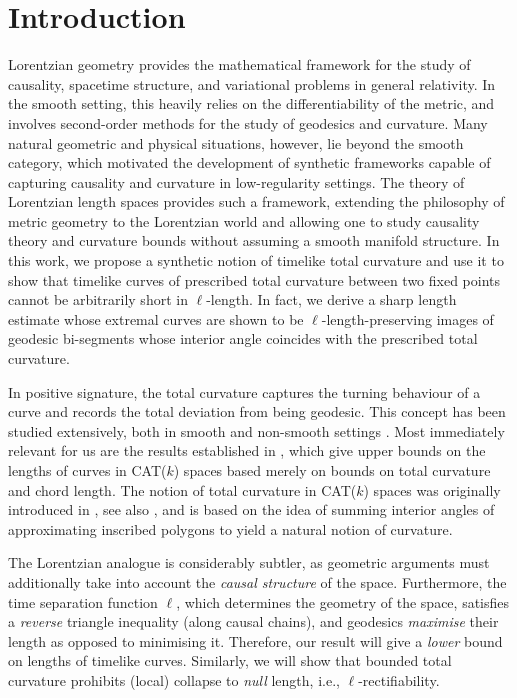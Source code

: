 \documentclass[hidelinks,12pt,a4paper]{article}
\numberwithin{equation}{section}
\theoremstyle{plain}
\theoremstyle{definition}
\begin{document}
\section{Introduction}
Lorentzian geometry provides the mathematical framework for the study of causality, spacetime structure, and variational problems in general relativity. 
In the smooth setting, this heavily relies on the differentiability of the metric, and involves second-order methods for the study of geodesics and curvature.
Many natural geometric and physical situations, however, lie beyond the smooth category, which motivated the development of synthetic frameworks capable of capturing causality and curvature in low-regularity settings.
The theory of Lorentzian length spaces \cite{KS18} provides such a framework, extending the philosophy of metric geometry to the Lorentzian world and allowing one to study causality theory and curvature bounds without assuming a smooth manifold structure. 
In this work, we propose a synthetic notion of timelike total curvature and use it to show that timelike curves of prescribed total curvature between two fixed points cannot be arbitrarily short in $\ell$-length. 
In fact, we derive a sharp length estimate whose extremal curves are shown to be $\ell$-length-preserving images of geodesic bi-segments whose interior angle coincides with the prescribed total curvature.

In positive signature, the total curvature captures the turning behaviour of a curve and records the total deviation from being geodesic. 
This concept has been studied extensively, both in smooth and non-smooth settings \cite{Mil50, Gra89, ABG2010, BFG15, CS24}.
Most immediately relevant for us are the results established in \cite{ML2003, CM16}, which give upper bounds on the lengths of curves in CAT($k$) spaces based merely on bounds on total curvature and chord length.
The notion of total curvature in CAT($k$) spaces was originally introduced in \cite{AB98}, see also \cite{LMM2010}, and is based on the idea of summing interior angles of approximating inscribed polygons to yield a natural notion of curvature.

The Lorentzian analogue is considerably subtler, as geometric arguments must additionally take into account the \emph{causal structure} of the space.
Furthermore, the time separation function $\ell$, which determines the geometry of the space, satisfies a \emph{reverse} triangle inequality (along causal chains), and geodesics \emph{maximise} their length as opposed to minimising it. 
Therefore, our result will give a \emph{lower} bound on lengths of timelike curves.
Similarly, we will show that bounded total curvature prohibits (local) collapse to \emph{null} length, i.e., $\ell$-rectifiability.
\end{document}
